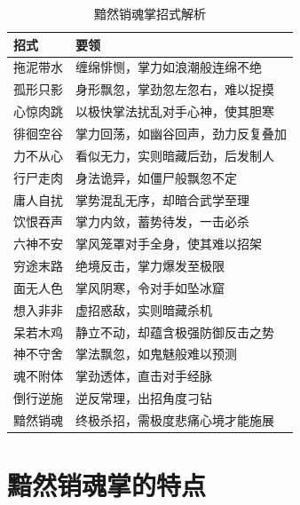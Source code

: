 \begin{table}[!h]
    \caption{黯然销魂掌招式解析}
    \begin{tabular}{l l}
        \toprule
        \textbf{招式} & \textbf{要领} \\
        \midrule
        拖泥带水 & 缠绵悱恻，掌力如浪潮般连绵不绝 \\
        孤形只影 & 身形飘忽，掌劲忽左忽右，难以捉摸 \\
        心惊肉跳 & 以极快掌法扰乱对手心神，使其胆寒 \\
        徘徊空谷 & 掌力回荡，如幽谷回声，劲力反复叠加 \\
        力不从心 & 看似无力，实则暗藏后劲，后发制人 \\
        行尸走肉 & 身法诡异，如僵尸般飘忽不定 \\
        庸人自扰 & 掌势混乱无序，却暗合武学至理 \\
        饮恨吞声 & 掌力内敛，蓄势待发，一击必杀 \\
        六神不安 & 掌风笼罩对手全身，使其难以招架 \\
        穷途末路 & 绝境反击，掌力爆发至极限 \\
        面无人色 & 掌风阴寒，令对手如坠冰窟 \\
        想入非非 & 虚招惑敌，实则暗藏杀机 \\
        呆若木鸡 & 静立不动，却蕴含极强防御反击之势 \\
        神不守舍 & 掌法飘忽，如鬼魅般难以预测 \\
        魂不附体 & 掌劲透体，直击对手经脉 \\
        倒行逆施 & 逆反常理，出招角度刁钻 \\
        黯然销魂 & 终极杀招，需极度悲痛心境才能施展 \\
        \bottomrule
    \end{tabular}
\end{table}

\section{黯然销魂掌的特点}